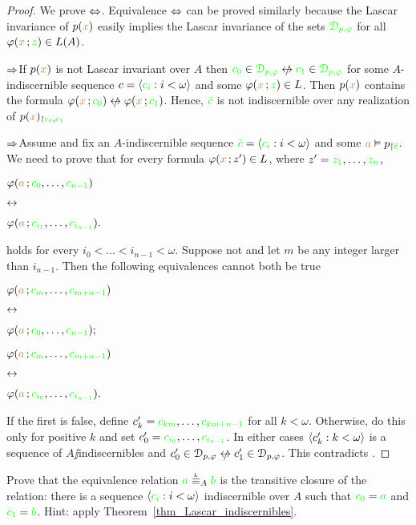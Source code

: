 \documentclass[creche.tex]{subfiles}
\begin{document}
\begin{proof} We prove $\Leftrightarrow$. Equivalence  $\Leftrightarrow$ can be proved similarly because the Lascar invariance of $p({\color{brown} x})$ easily implies the Lascar invariance of the sets ${\color{green}\EuScript D_{p,\varphi}}$ for all $\varphi({\color{brown} x}\,;{\color{green} z})\in L(A)$.

  \def\ceq#1#2#3{\parbox[t]{30ex}{$\displaystyle #1$}\parbox[t]{5ex}{$\displaystyle\hfil #2$}{$\displaystyle #3$}}
  $\Rightarrow$\quad If $p({\color{brown} x})$ is not Lascar invariant over $A$ then ${\gr c_0}\in{\gr\D_{p,\phi}}\niff {\gr c_1}\in{\gr\D_{p,\phi}}$ for some $A$-indiscernible sequence $c=\langle{\color{green}c_i}:i<\omega\rangle$ and some $\varphi({\color{brown} x}\,;{\color{green} z})\in L$. Then $p({\color{brown} x})$ contains the formula $\phi({\mr x}\,;{\gr c_0})\niff \phi({\mr x}\,;{\gr c_1})$. Hence, ${\color{green}\bar c}$ is not indiscernible over any realization of $p({\color{brown} x})_{\restriction{\color{green}c_0},{\color{green} c_1}}$ 
  
  $\Rightarrow$\quad Assume  and fix an $A$-indiscernible sequence ${\color{green}\bar c}=\langle{\color{green}c_i}:i<\omega\rangle$ and some ${\color{brown} a}\vDash p_{\restriction{\color{green}\bar c}}$. We need to prove that for every formula $\varphi({\color{brown} x}\,;z')\in L$, where $z'={\color{green} z_1},\dots,{\color{green} z_n}$,

  \ceq{\hfill\phi({\mr a}\,;{\gr c_{0}},\dots,{\gr c_{n-1}})}{\iff}{\phi({\mr a}\,;{\gr c_{i_1}},\dots,{\gr c_{i_{n-1}}}).}

  holds for every $i_0<\dots<i_{n-1}<\omega$. Suppose not and let $m$ be any integer larger than $i_{n-1}$. Then the following equivalences cannot both be true

  \ceq{\hfill\phi({\mr a}\,;{\gr c_m},\dots,{\gr c_{m+n-1}})}{\iff}{\phi({\mr a}\,;{\gr c_0},\dots,{\gr c_{n-1}});}


  \ceq{\hfill\phi({\mr a}\,;{\gr c_m},\dots,{\gr c_{m+n-1}})}{\iff}{\phi({\mr a}\,;{\gr c_{i_0}},\dots,{\gr c_{i_{n-1}}}).}

  If the first is false, define $c'_k={\color{green} c_{km}},\dots,{\color{green} c_{km+n-1}}$ for all $k<\omega$. Otherwise, do this only for positive $k$ and set $c'_0={\color{green} c_{i_0}},\dots,{\color{green} c_{i_{n-1}}}$. In either cases $\langle c'_k:k<\omega\rangle$ is a sequence of $A\jj$in\-dis\-cern\-i\-bles and $c'_0\in\D_{p,\phi}\niff c'_1\in\D_{p,\phi}$. This contradicts .
\end{proof}

\begin{exercise}\label{ex_Lstp_indiscernibles}
  Prove that the equivalence relation ${\gr a}\stackrel{\smash{\scalebox{.5}{\rm L}}}{\equiv}_A{\gr b}$ is the transitive closure of the relation: there is a sequence $\langle{\color{green}c_i}:i<\omega\rangle$ indiscernible over $A$ such that ${\color{green} c_0}={\color{green} a}$ and ${\color{green} c_1}={\color{green} b}$. Hint: apply Theorem~\ref{thm_Lascar_indiscernibles}.\QED
\end{exercise}
\end{document}
